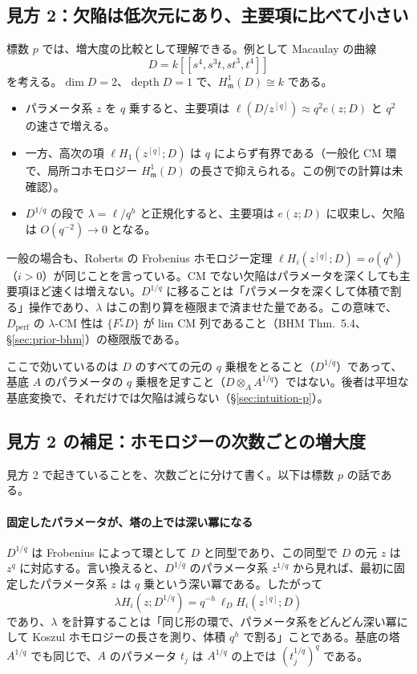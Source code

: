 \documentclass[11pt,a4paper]{ltjsarticle}
\numberwithin{equation}{section}
\theoremstyle{plain}
\theoremstyle{definition}
\theoremstyle{definition}
\newcommand{\m}{\mathfrak{m}}
\begin{document}
\subsection{見方 2：欠陥は低次元にあり、主要項に比べて小さい}

標数 $p$ では、増大度の比較として理解できる。例として Macaulay の曲線
\[
  D = k[[s^4, s^3t, st^3, t^4]]
\]
を考える。$\dim D = 2$、$\operatorname{depth} D = 1$ で、$H^1_\m(D)\cong k$ である。
\begin{itemize}
  \item パラメータ系 $z$ を $q$ 乗すると、主要項は $\ell(D/z^{[q]})\approx q^2 e(z;D)$ と $q^2$ の速さで増える。
  \item 一方、高次の項 $\ell H_1(z^{[q]};D)$ は $q$ によらず有界である（一般化 CM 環で、局所コホモロジー $H^1_\m(D)$ の長さで抑えられる。この例での計算は未確認）。
  \item $D^{1/q}$ の段で $\lambda = \ell/q^h$ と正規化すると、主要項は $e(z;D)$ に収束し、欠陥は $O(q^{-2})\to 0$ となる。
\end{itemize}
一般の場合も、Roberts の Frobenius ホモロジー定理 $\ell H_i(z^{[q]};D) = o(q^h)$（$i>0$）が同じことを言っている。CM でない欠陥はパラメータを深くしても主要項ほど速くは増えない。$D^{1/q}$ に移ることは「パラメータを深くして体積で割る」操作であり、$\lambda$ はこの割り算を極限まで済ませた量である。この意味で、$D_{\mathrm{perf}}$ の $\lambda$-CM 性は $\{F^e_*D\}$ が lim CM 列であること（BHM Thm.~5.4、§\ref{sec:prior-bhm}）の極限版である。

ここで効いているのは $D$ のすべての元の $q$ 乗根をとること（$D^{1/q}$）であって、基底 $A$ のパラメータの $q$ 乗根を足すこと（$D\otimes_A A^{1/q}$）ではない。後者は平坦な基底変換で、それだけでは欠陥は減らない（\S\ref{sec:intuition-p}）。

\subsection{見方 2 の補足：ホモロジーの次数ごとの増大度}\label{sec:intuition-growth}

見方 2 で起きていることを、次数ごとに分けて書く。以下は標数 $p$ の話である。

\paragraph{固定したパラメータが、塔の上では深い冪になる}
$D^{1/q}$ は Frobenius によって環として $D$ と同型であり、この同型で $D$ の元 $z$ は $z^q$ に対応する。言い換えると、$D^{1/q}$ のパラメータ系 $z^{1/q}$ から見れば、最初に固定したパラメータ系 $z$ は $q$ 乗という深い冪である。したがって
\[
  \lambda H_i(z; D^{1/q}) = q^{-h}\,\ell_D H_i(z^{[q]}; D)
\]
であり、$\lambda$ を計算することは「同じ形の環で、パラメータ系をどんどん深い冪にして Koszul ホモロジーの長さを測り、体積 $q^h$ で割る」ことである。基底の塔 $A^{1/q}$ でも同じで、$A$ のパラメータ $t_j$ は $A^{1/q}$ の上では $(t_j^{1/q})^q$ である。
\end{document}
